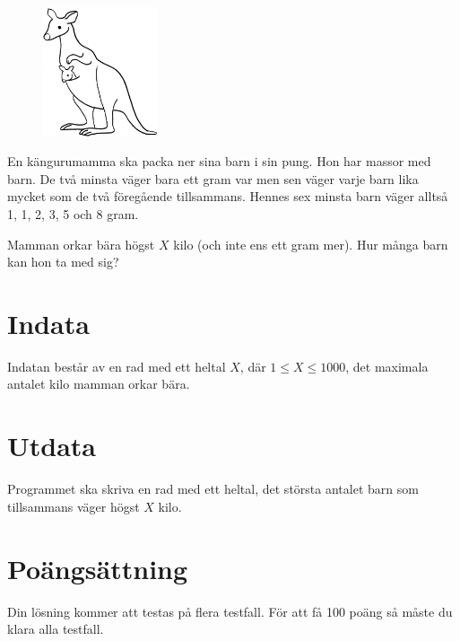 
\begin{figure}[!h]
\begin{center}
\includegraphics[width=0.3\textwidth]{kangaroo.png} 
\end{center}
\end{figure}

En kängurumamma ska packa ner sina barn i sin pung. Hon har massor med
barn. De två minsta väger bara ett gram var men sen väger varje barn
lika mycket som de två föregående tillsammans. Hennes sex minsta barn
väger alltså 1, 1, 2, 3, 5 och 8 gram.

Mamman orkar bära högst $X$ kilo (och inte ens ett gram mer). Hur många barn kan hon ta med sig?

\section*{Indata}

Indatan består av en rad med ett heltal $X$, där $1\le X \le 1000$, det
maximala antalet kilo mamman orkar bära.

\section*{Utdata}

Programmet ska skriva en rad med ett heltal, det största antalet barn
som tillsammans väger högst $X$ kilo.


\section*{Poängsättning}
Din lösning kommer att testas på flera testfall. För att få 100 poäng så måste du klara alla testfall.
